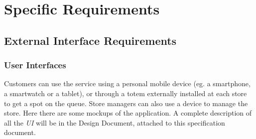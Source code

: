 \documentclass{article}
\begin{document}
\section{Specific Requirements}

	\subsection{External Interface Requirements}
	
		\subsubsection{User Interfaces}
		
			Customers can use the service using a personal mobile device (eg. a smartphone, a smartwatch or a tablet), or through a totem externally installed at each store to get a spot on the queue. Store managers can also use a device to manage the store. Here there are some mockups of the application. A complete description of all the \emph{UI} will be in the Design Document, attached to this specification document.
			\bigskip
			\bigskip
			\bigskip
			
\end{document}
